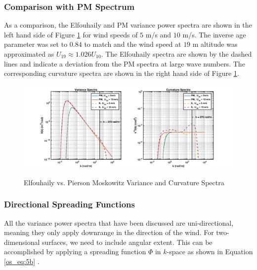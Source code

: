 \subsubsection {Comparison with PM Spectrum}
As a comparison, the Elfouhaily and PM variance power spectra are shown in the left hand side of Figure \ref{os_fig:2} for wind speeds of $5$ m/s and $10$ m/s. The inverse age parameter was set to $0.84$ to match and the wind speed at $19$ m altitude was approximated as $U_{19} \approx 1.026 U_{10}$. The Elfouhaily spectra are shown by the dashed lines and indicate a deviation from the PM spectra at large wave numbers. The corresponding curvature spectra are shown in the right hand side of Figure \ref{os_fig:2}.
 
\begin{figure}[H]
  \begin{center}
\includegraphics[width=6in]{../media/Ocean_Surface/elf_vs_PM_variance_curvature_spectrum.png}
  \end{center}
  \renewcommand{\baselinestretch}{1} \small\normalsize
  \begin{quote}
    \caption[Elfouhaily vs. Pierson Moskowitz Variance and Curvature Spectra]{Elfouhaily vs. Pierson Moskowitz Variance and Curvature Spectra\label{os_fig:2}}
  \end{quote}
\end{figure}
\renewcommand{\baselinestretch}{2} \small\normalsize

\subsubsection{Directional Spreading Functions}
All the variance power spectra that have been discussed are uni-directional, meaning they only apply downrange in the direction of the wind. For two-dimensional surfaces, we need to include angular extent. This can be accomplished by applying a spreading function $\Phi$ in $k$-space as shown in Equation \ref{os_eq:5b} \cite{elfouhaily}.

